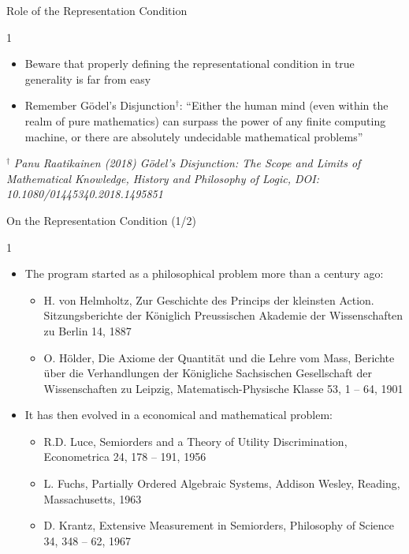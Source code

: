 \documentclass{beamer}
\begin{document}
\begin{frame}{\centerline{Role of the Representation Condition}}
1

\begin{itemize}
\item Beware that properly defining the representational condition in true generality is far from easy
\item Remember G\"{o}del's Disjunction$^\dag$: ``Either the human mind (even within the realm of pure mathematics) can surpass the power of any finite computing machine, or there are absolutely undecidable mathematical problems''
\end{itemize}

$^\dag$ \textit{\small
Panu Raatikainen (2018) G\"{o}del's Disjunction: The Scope and Limits of Mathematical Knowledge, History and Philosophy of Logic, DOI: 10.1080/01445340.2018.1495851}

\end{frame}

\begin{frame}{\centerline{On the Representation Condition (1/2)}}
1

\begin{itemize}
\item The program started as a philosophical problem more than a century ago:
\begin{itemize}
\item H. von Helmholtz, Zur Geschichte des Princips der kleinsten Action. Sitzungsberichte der K\"{o}niglich Preussischen Akademie der Wissenschaften zu Berlin 14, 1887
\item O. H\"{o}lder, Die Axiome der Quantit\"{a}t und die Lehre vom Mass, Berichte \"{u}ber die Verhandlungen der K\"{o}nigliche Sachsischen Gesellschaft der Wissenschaften zu Leipzig, Matematisch-Physische Klasse 53, 1 -- 64, 1901
\end{itemize}
\item It has then evolved in a economical and mathematical problem:
\begin{itemize}
\item R.D. Luce, Semiorders and a Theory of Utility Discrimination, Econometrica 24, 178 -- 191, 1956
\item L. Fuchs, Partially Ordered Algebraic Systems, Addison Wesley, Reading, Massachusetts, 1963
\item D. Krantz, Extensive Measurement in Semiorders, Philosophy of Science 34, 348 -- 62, 1967
\end{itemize}
\end{itemize}


\end{frame}
\end{document}
